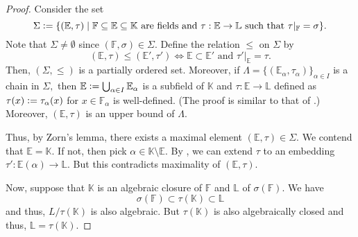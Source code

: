 \extendtoalgextension*\label{thm:extendtoalgextension2}
\begin{flushright}\hyperref[thm:extendtoalgextension]{\upsym}\end{flushright}
\begin{proof}
    Consider the set
    \begin{equation*} 
        \Sigma \vcentcolon= \{(\mathbb{E}, \tau) \mid \mathbb{F} \subset \mathbb{E} \subset \mathbb{K} \text{ are fields and } \tau : \mathbb{E} \to \mathbb{L} \text{ such that }\tau|_{\mathbb{F}} = \sigma\}.
    \end{equation*}
    Note that $\Sigma \neq \emptyset$ since $(\mathbb{F}, \sigma) \in \Sigma.$ Define the relation $\le$ on $\Sigma$ by
    \begin{equation*} 
        (\mathbb{E}, \tau) \le (\mathbb{E}', \tau') \iff \mathbb{E} \subset \mathbb{E}' \text{ and } \tau'|_{\mathbb{E}} = \tau.
    \end{equation*}
    Then, $(\Sigma, \le)$ is a partially ordered set. Moreover, if $\Lambda = \{(\mathbb{E}_\alpha, \tau_\alpha)\}_{\alpha \in I}$ is a chain in $\Sigma,$ then $\mathbb{E} \vcentcolon= \bigcup_{\alpha \in I}\mathbb{E}_\alpha$ is a subfield of $\mathbb{K}$ and $\tau : \mathbb{E} \to \mathbb{L}$ defined as $\tau(x) \vcentcolon= \tau_\alpha(x)$ for $x \in \mathbb{F}_\alpha$ is well-defined. (The proof is similar to that of .) Moreover, $(\mathbb{E}, \tau)$ is an upper bound of $\Lambda.$   

    Thus, by Zorn's lemma, there exists a maximal element $(\mathbb{E}, \tau) \in \Sigma.$ We contend that $\mathbb{E} = \mathbb{K}.$ If not, then pick $\alpha \in \mathbb{K} \setminus \mathbb{E}.$ By , we can extend $\tau$ to an embedding $\tau' : \mathbb{E}(\alpha) \to \mathbb{L}.$ But this contradicts maximality of $(\mathbb{E}, \tau).$

    Now, suppose that $\mathbb{K}$ is an algebraic closure of $\mathbb{F}$ and $\mathbb{L}$ of $\sigma(\mathbb{F}).$ We have
    \begin{equation*} 
        \sigma(\mathbb{F}) \subset \tau(\mathbb{K}) \subset \mathbb{L}
    \end{equation*}
    and thus, $L/\tau(\mathbb{K})$ is also algebraic. But $\tau(\mathbb{K})$ is also algebraically closed and thus, $\mathbb{L} = \tau(\mathbb{K}).$
\end{proof}

